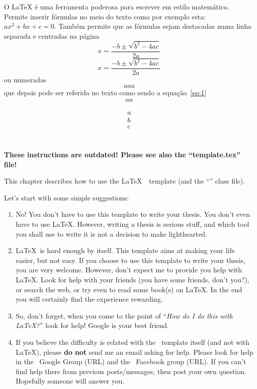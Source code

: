 O LaTeX é uma ferramenta poderosa para escrever em estilo matemático. Permite inserir fórmulas no meio do texto como por exemplo esta: $ax^2 + bx + c = 0$. Também permite que as fórmulas sejam destacadas numa linha separada e centradas na página 
$$x = \frac{-b \pm \sqrt{b^2-4ac}}{2a}$$
\[x = \frac{-b \pm \sqrt{b^2-4ac}}{2a}\]
ou numeradas 
\begin{equation}
aaa
\label{eq:1}
\end{equation}
que depois pode ser referida no texto como sendo a equação~\ref{eq:1}
$$\begin{array}{l}
aa
\end{array}
$$

\begin{eqnarray}
a\\
b\\
c\\
\end{eqnarray}

{\LARGE \textbf{~\\These instructions are outdated! Please see also the “template.tex” file!\\}}

This chapter describes how to use the \LaTeX\ \unlthesis\ template (and the “\unlthesisclass” class file).

Let's start with some simple suggestions:

\begin{enumerate}
  \item No! You don't have to use this template to write your thesis.  You don't even have to use \LaTeX.  However, writing a thesis is serious stuff, and which tool you shall use to write it is not a decision to make lighthearted.
  \item \LaTeX\ is hard enough by itself.  This template aims at making your life easier, but not easy. If you choose to use this template to write your thesis, you are very welcome.  However, don't expect me to provide you help with \LaTeX.  Look for help with your friends (you have some friends, don't you?), or search the web, or try even to read some book(s) on \LaTeX. In the end you will certainly find the experience rewarding.
  \item So, don't forget, when you come to the point of “\emph{How do I do this with \LaTeX?}” look for help!  Google is your best friend. 
  \item If you believe the difficulty is related with the \unlthesis\ template itself (and not with \LaTeX), please \textbf{do not} send me an email asking for help.  Please look for help in the \unlthesis\ Google Group (URL) and the \unlthesis\ Facebook group (URL).  If you can't find help there from previous posts/messages, then post your own question. Hopefully someone will answer you.
\end{enumerate}

